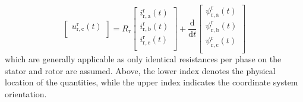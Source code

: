 \begin{frame}
\begin{equation}
\begin{bmatrix}
                u_{\mathrm{r,c}}^\mathrm{r}(t)\\
            \end{bmatrix} = R_\mathrm{r} \begin{bmatrix}
                i_{\mathrm{r,a}}^\mathrm{r}(t)\\
                i_{\mathrm{r,b}}^\mathrm{r}(t)\\
                i_{\mathrm{r,c}}^\mathrm{r}(t)\\
            \end{bmatrix} + \frac{\mathrm{d}}{\mathrm{d}t} \begin{bmatrix}
                \psi_{\mathrm{r,a}}^\mathrm{r}(t)\\
                \psi_{\mathrm{r,b}}^\mathrm{r}(t)\\
                \psi_{\mathrm{r,c}}^\mathrm{r}(t)\\
            \end{bmatrix}
            \label{eq:IM_rotor_three_phase_voltage_equation}
    \end{equation}
which are generally applicable as only identical resistances per phase on the stator and rotor are assumed. Above, the lower index denotes the physical location of the quantities, while the upper index indicates the coordinate system orientation.
\end{frame}

